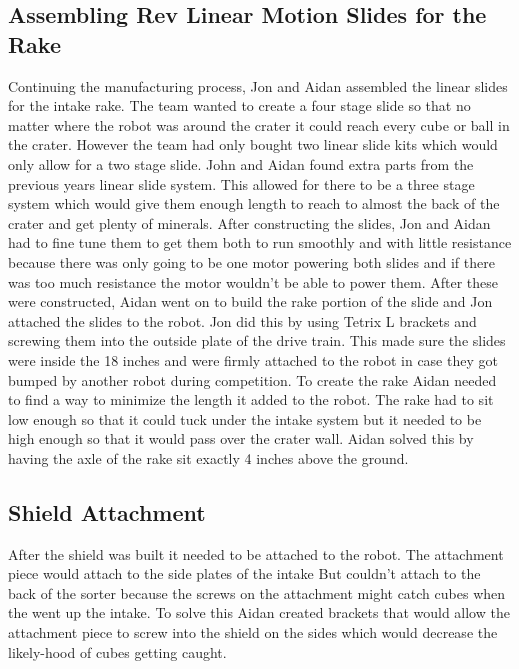 \documentclass{article}
\newif\ifcontents
\begin{document}
\contentsfalse

\subsection{Assembling Rev Linear Motion Slides for the Rake}
Continuing the manufacturing process, Jon and Aidan assembled the linear slides for the intake rake. The team wanted to create a four stage slide so that no matter where the robot was around the crater it could reach every cube or ball in the crater. However the team had only bought two linear slide kits which would only allow for a two stage slide. John and Aidan found extra parts from the previous years linear slide system. This allowed for there to be a three stage system which would give them enough length to reach to almost the back of the crater and get plenty of minerals. After constructing the slides, Jon and Aidan had to fine tune them to get them both to run smoothly and with little resistance because there was only going to be one motor powering both slides and if there was too much resistance the motor wouldn't be able to power them. After these were constructed, Aidan went on to build the rake portion of the slide and Jon attached the slides to the robot. Jon did this by using Tetrix L brackets and screwing them into the outside plate of the drive train. This made sure the slides were inside the 18 inches and were firmly attached to the robot in case they got bumped by another robot during competition. To create the rake Aidan needed to find a way to minimize the length it added to the robot. The rake had to sit low enough so that it could tuck under the intake system but it needed to be high enough so that it would pass over the crater wall. Aidan solved this by having the axle of the rake sit exactly 4 inches above the ground.

\subsection{Shield Attachment}
After the shield was built it needed to be attached to the robot. The attachment piece would attach to the side plates of the intake But couldn't attach to the back of the sorter because the screws on the attachment might catch cubes when the went up the intake. To solve this Aidan created brackets that would allow the attachment piece to screw into the shield on the sides which would decrease the likely-hood of cubes getting caught.
\end{document}
